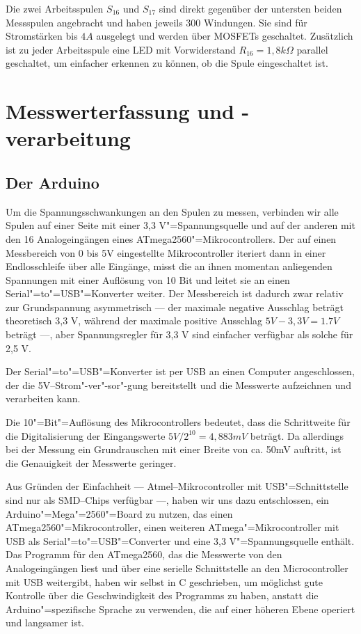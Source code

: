 Die zwei Arbeitsspulen $S_{16}$ und $S_{17}$ sind direkt gegenüber der untersten beiden Messspulen angebracht und haben jeweils 300 Windungen.
Sie sind für Stromstärken bis $4A$ ausgelegt und werden über MOSFETs geschaltet.
Zusätzlich ist zu jeder Arbeitsspule eine LED mit Vorwiderstand $R_{16} = 1,8 k\Omega$ parallel geschaltet, um einfacher erkennen zu können, ob die Spule eingeschaltet ist.


\section{Messwerterfassung und -verarbeitung}

\subsection{Der Arduino}

Um die Spannungsschwankungen an den Spulen zu messen,
verbinden wir alle Spulen auf einer Seite mit einer 3,3 V"=Spannungsquelle und auf der
anderen mit den 16 Analogeingängen eines ATmega2560"=Mikrocontrollers. Der auf einen
Messbereich von 0 bis 5V eingestellte Mikrocontroller iteriert dann in einer Endlosschleife
über alle Eingänge, misst die an ihnen momentan anliegenden Spannungen mit einer
Auflösung von 10 Bit \citep[S. 275]{atmegadatasheet} und leitet sie an einen Serial"=to"=USB"=Konverter weiter. Der Messbereich
ist dadurch zwar relativ zur Grundspannung asymmetrisch --- der maximale negative Ausschlag beträgt
theoretisch 3,3 V, während der maximale positive Ausschlag $ 5V - 3,3 V = 1.7 V $ beträgt ---, aber
Spannungsregler für 3,3 V sind einfacher verfügbar als solche für 2,5 V.

Der Serial"=to"=USB"=Konverter ist per USB an einen Computer angeschlossen, der die 5V--Strom"-ver"-sor"-gung
bereitstellt und die Messwerte aufzeichnen und verarbeiten kann.

Die 10"=Bit"=Auflösung des Mikrocontrollers bedeutet, dass die Schrittweite für die Digitalisierung
der Eingangswerte $ 5 V / 2^{10} = 4,883 mV $ beträgt. Da allerdings bei der Messung ein
Grundrauschen mit einer Breite von ca. 50mV auftritt, ist die Genauigkeit der Messwerte geringer.

Aus Gründen der Einfachheit --- Atmel--Mikrocontroller mit USB"=Schnittstelle sind nur als SMD--Chips
verfügbar ---, haben wir uns dazu entschlossen, ein Arduino"=Mega"=2560"=Board zu nutzen, das einen
ATmega2560"=Mikrocontroller, einen weiteren ATmega"=Mikrocontroller mit USB als Serial"=to"=USB"=Converter und eine 
3,3 V"=Spannungsquelle enthält\citep{arduinowiki}. Das Programm für den ATmega2560, das die Messwerte von den
Analogeingängen liest und über eine serielle Schnittstelle an den Microcontroller mit USB weitergibt, haben
wir selbst in C geschrieben, um möglichst gute Kontrolle über die Geschwindigkeit des Programms
zu haben, anstatt die Arduino"=spezifische Sprache zu verwenden, die auf
einer höheren Ebene operiert und langsamer ist.

